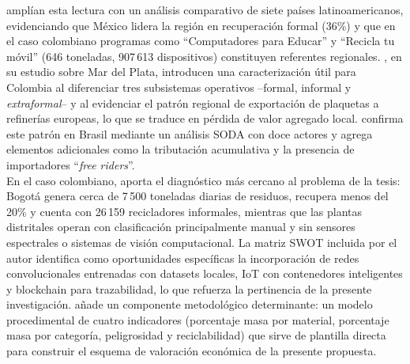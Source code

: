 \cite{zambranoyepezBuenasPracticasManejo2022} amplían esta lectura con un análisis comparativo de siete países latinoamericanos, evidenciando que México lidera la región en recuperación formal (36\%) y que en el caso colombiano programas como ``Computadores para Educar'' y ``Recicla tu móvil'' (646 toneladas, 907\,613 dispositivos) constituyen referentes regionales. \cite{clinckspoorAnalisisActoresInvolucrados2020}, en su estudio sobre Mar del Plata, introducen una caracterización útil para Colombia al diferenciar tres subsistemas operativos --formal, informal y \textit{extraformal}-- y al evidenciar el patrón regional de exportación de plaquetas a refinerías europeas, lo que se traduce en pérdida de valor agregado local. \cite{souzaCHALLENGESTRANSITIONCIRCULAR2025} confirma este patrón en Brasil mediante un análisis SODA con doce actores y agrega elementos adicionales como la tributación acumulativa y la presencia de importadores ``\textit{free riders}''.\\

En el caso colombiano, \cite{a.ceronRecyclableWasteClassification2025a} aporta el diagnóstico más cercano al problema de la tesis: Bogotá genera cerca de 7\,500 toneladas diarias de residuos, recupera menos del 20\% y cuenta con 26\,159 recicladores informales, mientras que las plantas distritales operan con clasificación principalmente manual y sin sensores espectrales o sistemas de visión computacional. La matriz SWOT incluida por el autor identifica como oportunidades específicas la incorporación de redes convolucionales entrenadas con datasets locales, IoT con contenedores inteligentes y blockchain para trazabilidad, lo que refuerza la pertinencia de la presente investigación. \cite{venegasmarcelModeloProcedimentalPara2020} añade un componente metodológico determinante: un modelo procedimental de cuatro indicadores (porcentaje masa por material, porcentaje masa por categoría, peligrosidad y reciclabilidad) que sirve de plantilla directa para construir el esquema de valoración económica de la presente propuesta.\\

